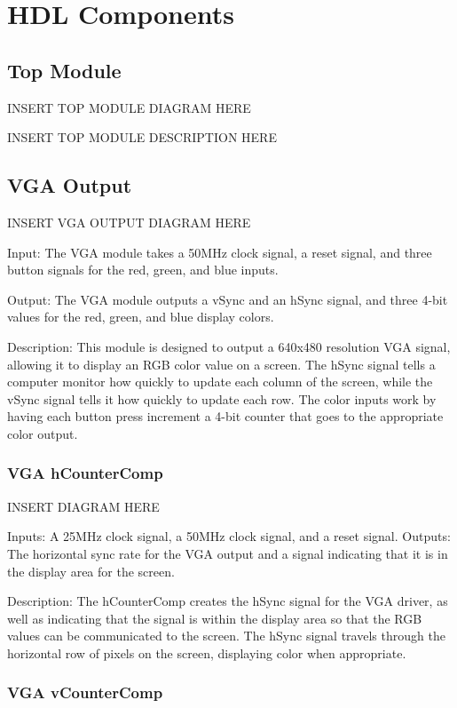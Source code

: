 \documentclass[a4paper]{article}
\begin{document}
\section{HDL Components}

\subsection{Top Module}

INSERT TOP MODULE DIAGRAM HERE

INSERT TOP MODULE DESCRIPTION HERE

\subsection{VGA Output}

INSERT VGA OUTPUT DIAGRAM HERE

Input: The VGA module takes a 50MHz clock signal, a reset signal, and three button signals for the red, green, and blue inputs.

Output: The VGA module outputs a vSync and an hSync signal, and three 4-bit values for the red, green, and blue display colors.

Description: This module is designed to output a 640x480 resolution VGA signal, allowing it to display an RGB color value on a screen. The hSync signal tells a computer monitor how quickly to update each column of the screen, while the vSync signal tells it how quickly to update each row. The color inputs work by having each button press increment a 4-bit counter that goes to the appropriate color output.

\subsubsection{VGA hCounterComp}

INSERT DIAGRAM HERE

Inputs: A 25MHz clock signal, a 50MHz clock signal, and a reset signal.
Outputs: The horizontal sync rate for the VGA output and a signal indicating that it is in the display area for the screen.

Description: The hCounterComp creates the hSync signal for the VGA driver, as well as indicating that the signal is within the display area so that the RGB values can be communicated to the screen. The hSync signal travels through the horizontal row of pixels on the screen, displaying color when appropriate.

\subsubsection{VGA vCounterComp}
\end{document}
